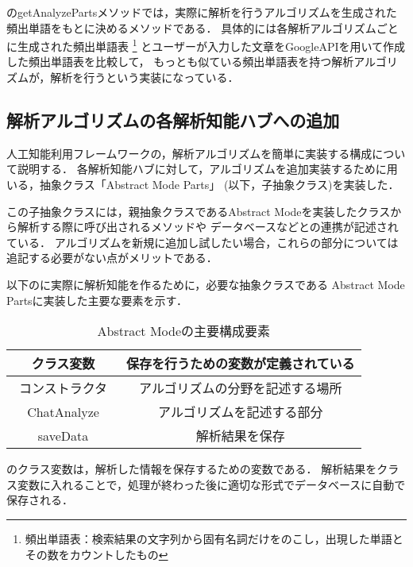 のgetAnalyzePartsメソッドでは，実際に解析を行うアルゴリズムを生成された
頻出単語をもとに決めるメソッドである．
具体的には各解析アルゴリズムごとに生成された頻出単語表
\footnote{頻出単語表：検索結果の文字列から固有名詞だけをのこし，出現した単語とその数をカウントしたもの}
とユーザーが入力した文章をGoogleAPIを用いて作成した頻出単語表を比較して，
もっとも似ている頻出単語表を持つ解析アルゴリズムが，解析を行うという実装になっている．
\subsection{解析アルゴリズムの各解析知能ハブへの追加}\label{sec:anaAdd}
人工知能利用フレームワークの，解析アルゴリズムを簡単に実装する構成について説明する．
各解析知能ハブに対して，アルゴリズムを追加実装するために用いる，抽象クラス「Abstract Mode Parts」
(以下，子抽象クラス)を実装した．

この子抽象クラスには，親抽象クラスであるAbstract Modeを実装したクラスから解析する際に呼び出されるメソッドや
データベースなどとの連携が記述されている．
アルゴリズムを新規に追加し試したい場合，これらの部分については追記する必要がない点がメリットである．

以下のに実際に解析知能を作るために，必要な抽象クラスである
Abstract Mode Partsに実装した主要な要素を示す．

\begin{table}[tbh]
	\caption{Abstract Modeの主要構成要素} \label{tab:Abstract Mode Parts}
	\begin{center}
		\begin{tabular}[htb]{c|c}
		\hline
		クラス変数 & 保存を行うための変数が定義されている \\ \hline
		コンストラクタ　& アルゴリズムの分野を記述する場所 \\ \hline
		ChatAnalyze & アルゴリズムを記述する部分 \\ \hline
		saveData & 解析結果を保存 \\ \hline
		\end{tabular}
	\end{center}
\end{table}

のクラス変数は，解析した情報を保存するための変数である．
解析結果をクラス変数に入れることで，処理が終わった後に適切な形式でデータベースに自動で保存される．


